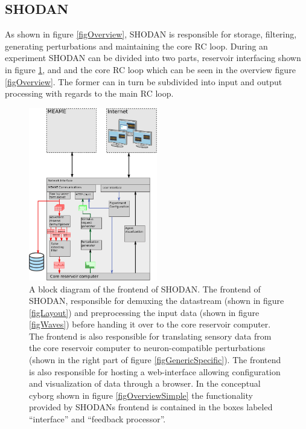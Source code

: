 \subsection{SHODAN}
As shown in figure \ref{figOverview}, SHODAN is responsible for storage, filtering,
generating perturbations and maintaining the core RC loop.
During an experiment SHODAN can be divided into two parts, reservoir interfacing
shown in figure \ref{figSHODANiface}, and and the core RC loop which can be seen
in the overview figure \ref{figOverview}.
The former can in turn be subdivided into input and output processing with
regards to the main RC loop.
\begin{figure}[h!]
  \centering
  \includegraphics[width=0.5\textwidth]{fig/SHODANfrontend.png}
  \caption[Block diagram of SHODANs frontend]{
    A block diagram of the frontend of SHODAN.
    The frontend of SHODAN, responsible for demuxing the datastream (shown in
    figure \ref{figLayout}) and
    preprocessing the input data (shown in figure \ref{figWaves}) before handing it
    over to the core reservoir computer.
    The frontend is also responsible for translating sensory data from the core
    reservoir computer to neuron-compatible perturbations (shown in the right
    part of figure \ref{figGenericSpecific}).
    The frontend is also responsible for hosting a web-interface allowing
    configuration and visualization of data through a browser.
    In the conceptual cyborg shown in figure \ref{figOverviewSimple} the
    functionality provided by SHODANs frontend is contained in the boxes labeled
    ``interface'' and ``feedback processor''.
  }
  \label{figSHODANiface}
\end{figure}
